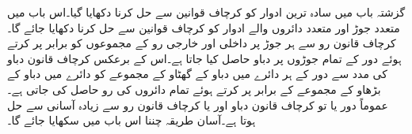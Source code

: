 گزشتہ باب میں سادہ ترین ادوار کو کرچاف قوانین سے حل کرنا دکھایا گیا۔اس باب میں متعدد جوڑ اور متعدد دائروں والے ادوار کو کرچاف قوانین سے حل کرنا دکھایا جائے گا۔کرچاف قانون رو سے ہر جوڑ پر داخلی اور خارجی رو کے مجموعوں کو برابر پر کرتے ہوئے دور کے تمام جوڑوں پر دباو حاصل کیا جاتا ہے۔اس کے برعکس کرچاف قانون دباو کی مدد سے دور کے ہر دائرے میں دباو کے گھٹاو کے مجموعے کو دائرے میں دباو کے  بڑھاو کے مجموعے کے برابر پر کرتے ہوئے تمام دائروں کی رو حاصل کی جاتی ہے۔عموماً  دور یا تو کرچاف قانون دباو اور یا کرچاف قانون رو سے زیادہ آسانی سے حل ہوتا ہے۔آسان طریقہ چننا اس باب میں سکھایا جائے گا۔

